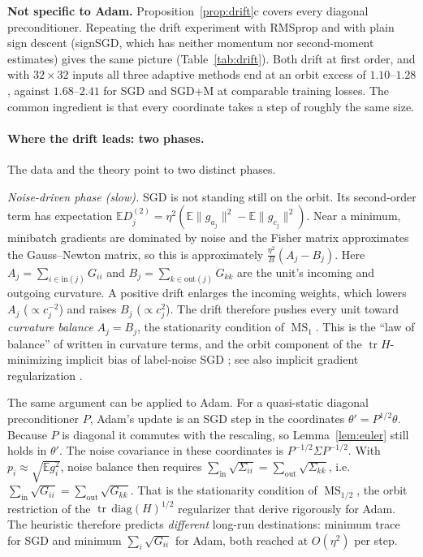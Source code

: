 \documentclass[10pt]{article}
\theoremstyle{remark}
\newcommand{\tr}{\operatorname{tr}}
\newcommand{\MS}{\operatorname{MS}}
\begin{document}
\textbf{Not specific to Adam.} Proposition~\ref{prop:drift}c covers every diagonal preconditioner. Repeating the drift experiment with RMSprop and with plain sign descent (signSGD, which has neither momentum nor second-moment estimates) gives the same picture (Table~\ref{tab:drift}). Both drift at first order, and with $32{\times}32$ inputs all three adaptive methods end at an orbit excess of $1.10$--$1.28$, against $1.68$--$2.41$ for SGD and SGD+M at comparable training losses. The common ingredient is that every coordinate takes a step of roughly the same size.

\paragraph{Where the drift leads: two phases.} The data and the theory point to two distinct phases.

\emph{Noise-driven phase (slow).} SGD is not standing still on the orbit. Its second-order term has expectation $\mathbb{E}D^{(2)}_j=\eta^2(\mathbb{E}\|g_{a_j}\|^2-\mathbb{E}\|g_{c_j}\|^2)$. Near a minimum, minibatch gradients are dominated by noise and the Fisher matrix approximates the Gauss--Newton matrix, so this is approximately $\frac{\eta^2}{B}(A_j-B_j)$. Here $A_j=\sum_{i\in\mathrm{in}(j)}G_{ii}$ and $B_j=\sum_{k\in\mathrm{out}(j)}G_{kk}$ are the unit's incoming and outgoing curvature. A positive drift enlarges the incoming weights, which lowers $A_j$ ($\propto c_j^{-2}$) and raises $B_j$ ($\propto c_j^{2}$). The drift therefore pushes every unit toward \emph{curvature balance} $A_j=B_j$, the stationarity condition of $\MS_1$. This is the ``law of balance'' of \citet{ziyin2023law,ziyin2024parameter} written in curvature terms, and the orbit component of the $\tr H$-minimizing implicit bias of label-noise SGD \citep{blanc2020implicit,damian2021label}; see also implicit gradient regularization \citep{barrett2021implicit}.

The same argument can be applied to Adam. For a quasi-static diagonal preconditioner $P$, Adam's update is an SGD step in the coordinates $\theta'=P^{1/2}\theta$. Because $P$ is diagonal it commutes with the rescaling, so Lemma~\ref{lem:euler} still holds in $\theta'$. The noise covariance in these coordinates is $P^{-1/2}\Sigma P^{-1/2}$. With $p_i\approx\sqrt{\mathbb{E}g_i^2}$, noise balance then requires $\sum_{\mathrm{in}}\sqrt{\Sigma_{ii}}=\sum_{\mathrm{out}}\sqrt{\Sigma_{kk}}$, i.e.\ $\sum_{\mathrm{in}}\sqrt{G_{ii}}=\sum_{\mathrm{out}}\sqrt{G_{kk}}$. That is the stationarity condition of $\MS_{1/2}$, the orbit restriction of the $\tr\,\mathrm{diag}(H)^{1/2}$ regularizer that \citet{li2025adam} derive rigorously for Adam. The heuristic therefore predicts \emph{different} long-run destinations: minimum trace for SGD and minimum $\sum_i\sqrt{G_{ii}}$ for Adam, both reached at $O(\eta^2)$ per step.
\end{document}
